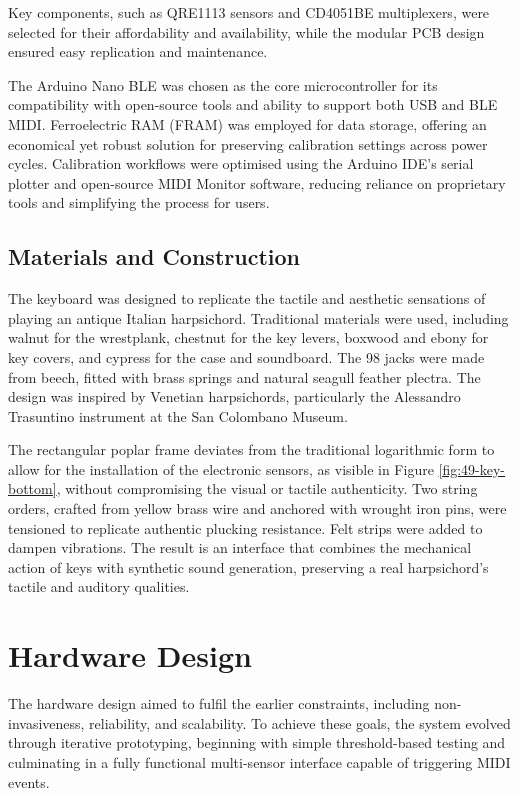 Key components, such as QRE1113 sensors and CD4051BE multiplexers, were selected for their affordability and availability, while the modular PCB design ensured easy replication and maintenance.

The Arduino Nano BLE was chosen as the core microcontroller for its compatibility with open-source tools and ability to support both USB and BLE MIDI. Ferroelectric RAM (FRAM) was employed for data storage, offering an economical yet robust solution for preserving calibration settings across power cycles. Calibration workflows were optimised using the Arduino IDE’s serial plotter and open-source MIDI Monitor software, reducing reliance on proprietary tools and simplifying the process for users.

\subsection{Materials and Construction}

The keyboard was designed to replicate the tactile and aesthetic sensations of playing an antique Italian harpsichord. Traditional materials were used, including walnut for the wrestplank, chestnut for the key levers, boxwood and ebony for key covers, and cypress for the case and soundboard. The 98 jacks were made from beech, fitted with brass springs and natural seagull feather plectra. The design was inspired by Venetian harpsichords, particularly the Alessandro Trasuntino instrument at the San Colombano Museum. 

The rectangular poplar frame deviates from the traditional logarithmic form to allow for the installation of the electronic sensors, as visible in Figure \ref{fig:49-key-bottom}, without compromising the visual or tactile authenticity. Two string orders, crafted from yellow brass wire and anchored with wrought iron pins, were tensioned to replicate authentic plucking resistance. Felt strips were added to dampen vibrations. The result is an interface that combines the mechanical action of keys with synthetic sound generation, preserving a real harpsichord's tactile and auditory qualities.


\section{Hardware Design}\label{hardware-design}

The hardware design aimed to fulfil the earlier constraints, including non-invasiveness, reliability, and scalability. To achieve these goals, the system evolved through iterative prototyping, beginning with simple threshold-based testing and culminating in a fully functional multi-sensor interface capable of triggering MIDI events.

